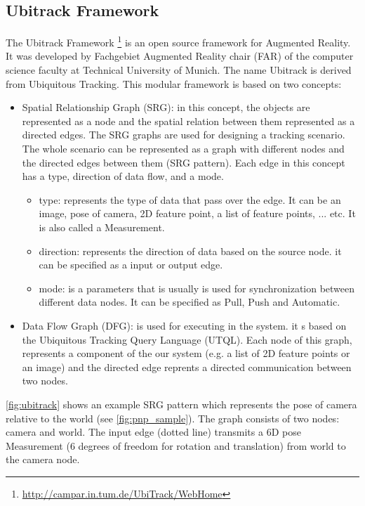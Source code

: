 \subsection{Ubitrack Framework} \label{sebsec:ubitrack}
The Ubitrack Framework \footnote {\url{http://campar.in.tum.de/UbiTrack/WebHome}} is an open source framework for Augmented Reality. It was developed by Fachgebiet Augmented Reality chair (FAR) of the computer science faculty at Technical University of Munich. The name Ubitrack is derived from Ubiquitous Tracking. This modular framework is based on two concepts:
\begin{itemize} 
\item Spatial Relationship Graph (SRG): in this concept, the objects are represented as a node and the spatial relation between them represented as a directed edges. The SRG graphs are used for designing a tracking scenario. The whole scenario can be represented as a graph with different nodes and the directed edges between them (SRG pattern). Each edge in this concept has a type, direction of data flow, and a mode. 
	\begin{itemize}
		\item type: represents the type of data that pass over the edge. It can be an image, pose of camera, 2D feature point, a list of feature points, ... etc. It is also called a Measurement.
		\item direction: represents the direction of data based on the source node. it can be specified as a input or output edge.
		\item mode: is a parameters that is usually is used for synchronization between different data nodes. It can be specified as Pull, Push and Automatic.
	\end{itemize}
\item Data Flow Graph (DFG): is used for executing in the system. it s based on the Ubiquitous Tracking Query Language (UTQL). Each node of this graph, represents a component of the our system (e.g. a list of 2D feature points or an image) and the directed edge reprents a directed communication between two nodes. 
\end{itemize}

 \autoref{fig:ubitrack} shows an example SRG pattern which represents the pose of camera relative to the world (see \autoref{fig:pnp_sample}). The graph consists of two nodes: camera and world. The input edge (dotted line) transmits a 6D pose Measurement (6 degrees of freedom for rotation and translation) from world to the camera node.

